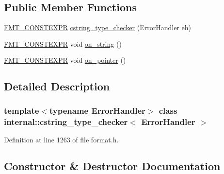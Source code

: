 \subsection*{Public Member Functions}
\begin{DoxyCompactItemize}
\item 
\hyperlink{core_8h_a69201cb276383873487bf68b4ef8b4cd}{F\+M\+T\+\_\+\+C\+O\+N\+S\+T\+E\+X\+PR} \hyperlink{classinternal_1_1cstring__type__checker_a8915e7dae89952f58ae63d14e5d67b17}{cstring\+\_\+type\+\_\+checker} (Error\+Handler eh)
\item 
\hyperlink{core_8h_a69201cb276383873487bf68b4ef8b4cd}{F\+M\+T\+\_\+\+C\+O\+N\+S\+T\+E\+X\+PR} void \hyperlink{classinternal_1_1cstring__type__checker_abf4cc18d281faa1e7974f1dbba95dd98}{on\+\_\+string} ()
\item 
\hyperlink{core_8h_a69201cb276383873487bf68b4ef8b4cd}{F\+M\+T\+\_\+\+C\+O\+N\+S\+T\+E\+X\+PR} void \hyperlink{classinternal_1_1cstring__type__checker_a08fec53620704e141326e0341328fb88}{on\+\_\+pointer} ()
\end{DoxyCompactItemize}


\subsection{Detailed Description}
\subsubsection*{template$<$typename Error\+Handler$>$\newline
class internal\+::cstring\+\_\+type\+\_\+checker$<$ Error\+Handler $>$}



Definition at line 1263 of file format.\+h.



\subsection{Constructor \& Destructor Documentation}
\mbox{\label{classinternal_1_1cstring__type__checker_a8915e7dae89952f58ae63d14e5d67b17}} 
